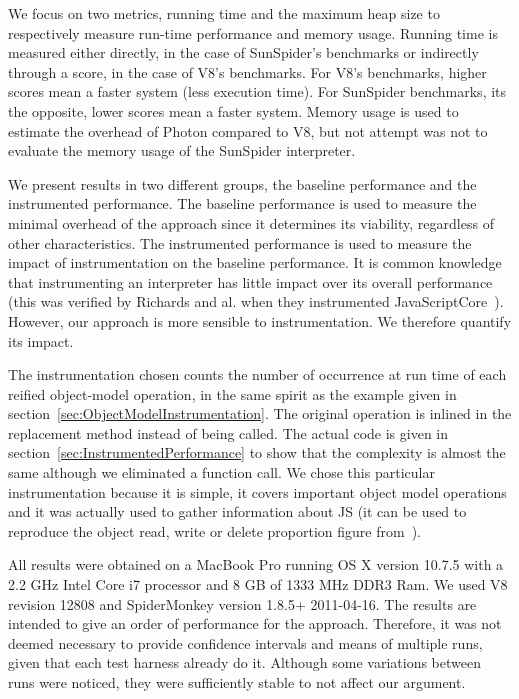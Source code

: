 We focus on two metrics, running time and the maximum heap size to respectively
measure run-time performance and memory usage. Running time is measured either
directly, in the case of SunSpider's benchmarks or indirectly through a score,
in the case of V8's benchmarks. For V8's benchmarks, higher scores mean a
faster system (less execution time). For SunSpider benchmarks, its the
opposite, lower scores mean a faster system.  Memory usage is used to estimate
the overhead of Photon compared to V8, but not attempt was not to evaluate the
memory usage of the SunSpider interpreter.

We present results in two different groups, the baseline performance and the
instrumented performance.  The baseline performance is used to measure the
minimal overhead of the approach since it determines its viability, regardless
of other characteristics.  The instrumented performance is used to measure the
impact of instrumentation on the baseline performance. It is common knowledge
that instrumenting an interpreter has little impact over its overall
performance (this was verified by Richards and al. when they instrumented
JavaScriptCore~\cite{behavior_js}).  However, our approach is more sensible to
instrumentation. We therefore quantify its impact. 

The instrumentation chosen counts the number of occurrence at run time of each
reified object-model operation, in the same spirit as the example given in
section~\ref{sec:ObjectModelInstrumentation}. The original operation is inlined
in the replacement method instead of being called. The actual code is given in
section~\ref{sec:InstrumentedPerformance} to show that the complexity is almost
the same although we eliminated a function call.  We chose this particular
instrumentation because it is simple, it covers important object model
operations and it was actually used to gather information about JS (it can be
used to reproduce the object read, write or delete proportion figure
from~\cite{behavior_js}).

All results were obtained on a MacBook Pro running OS X version 10.7.5 with a
2.2 GHz Intel Core i7 processor and 8 GB of 1333 MHz DDR3 Ram. We used V8
revision 12808 and SpiderMonkey version 1.8.5+ 2011-04-16. The results are
intended to give an order of performance for the approach. Therefore, it was
not deemed necessary to provide confidence intervals and means of multiple
runs, given that each test harness already do it. Although some variations
between runs were noticed, they were sufficiently stable to not affect our
argument.

